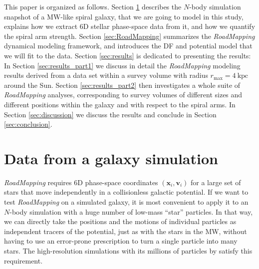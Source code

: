 \documentclass[iop,revtex4,numberedappendix,appendixfloats]{emulateapj}
\newcommand{\vect}[1]{\boldsymbol{#1}}
\newcommand{\RM}{{\sl RoadMapping}}
\begin{document}
This paper is organized as follows. Section \ref{sec:simulation} describes the $N$-body simulation snapshot of a MW-like spiral galaxy, that we are going to model in this study, explains how we extract 6D stellar phase-space data from it, and how we quantify the spiral arm strength. Section \ref{sec:RoadMapping} summarizes the \RM{} dynamical modeling framework, and introduces the DF and potential model that we will fit to the data. Section \ref{sec:results} is dedicated to presenting the results: In Section \ref{sec:results_part1} we discuss in detail the \RM{} modeling results derived from a data set within a survey volume with radius $r_\text{max}=4~\text{kpc}$ around the Sun. Section \ref{sec:results_part2} then investigates a whole suite of \RM{} analyses, corresponding to survey volumes of different sizes and different positions within the galaxy and with respect to the spiral arms. In Section \ref{sec:discussion} we discuss the results and conclude in Section \ref{sec:conclusion}.

\section{Data from a galaxy simulation} \label{sec:simulation}

\RM{} requires 6D phase-space coordinates $(\vect{x}_i,\vect{v}_i)$ for a large set of stars that move independently in a collisionless galactic potential. If we want to test \RM{} on a simulated galaxy, it is most convenient to apply it to an $N$-body simulation with a huge number of low-mass ``star'' particles. In that way, we can directly take the positions and the motions of individual particles as independent tracers of the potential, just as with the stars in the MW, without having to use an error-prone prescription to turn a single particle into many stars. The high-resolution simulations with its millions of particles by \citet{2013ApJ...766...34D} satisfy this requirement.
\end{document}
